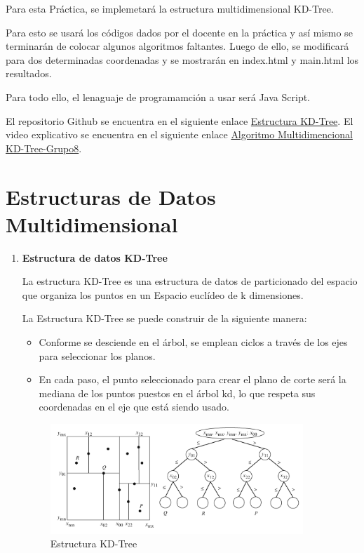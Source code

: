 \documentclass{article}
\begin{document}
	Para esta Práctica, se implemetará la estructura multidimensional KD-Tree.

    Para esto se usará los códigos dados por el docente en la práctica y así mismo se terminarán de colocar algunos algoritmos faltantes. Luego de ello, se modificará para dos determinadas coordenadas y se mostrarán en index.html y main.html los resultados.

    Para todo ello, el lenaguaje de programamción a usar será Java Script.
	
El repositorio Github se encuentra en el siguiente enlace \href{https://github.com/nestorcal/kdtree}{Estructura KD-Tree}.
El video explicativo se encuentra en el siguiente enlace \href{https://drive.google.com/file/d/1SdcIBezyhSePjlnDmgkuoMWF9ytabTYo/view}{Algoritmo Multidimencional KD-Tree-Grupo8}.
	
	\section{Estructuras de Datos Multidimensional}\label{sec:ejercicios}
	\begin{enumerate}
		\item \textbf{Estructura de datos KD-Tree}
		
			La estructura KD-Tree es una estructura de datos de particionado del espacio que organiza los puntos en un Espacio euclídeo de k dimensiones.

La Estructura KD-Tree se puede construir de la siguiente manera: 

\begin{itemize}
   \item Conforme se desciende en el árbol, se emplean ciclos a través de los ejes para seleccionar los planos.
   \item En cada paso, el punto seleccionado para crear el plano de corte será la mediana de los puntos puestos en el árbol kd, lo que respeta sus coordenadas en el eje que está siendo usado.

\end{itemize}	

\begin{figure}[H]
\centering
\includegraphics[width=0.9\textwidth]{Img/KD-Tree.png}
\caption{Estructura KD-Tree}
\end{figure}

\end{enumerate}
\end{document}
